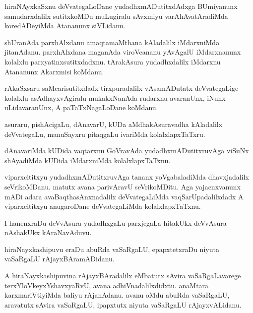 \documentclass{article}
\begin{document}
\begin{mn}
hiraNAyxkaSxnu deVvategaLoDane yudadhxmADutitxdAdxga BUmiyanunx
samudarxdalilx sutitxkoMDu muLugiralu sAvxmiyu varAhAvatAradiMda
koredADeyiMda Atananunx siVLidanu.
\end{mn}

\begin{mn}%
shUranAda parxhAlxdanu amaqtamaMthana kAladalilx iMdarxniMda
jitanAdanu. parxhAlxdana maganAda viroVcananu yAvAgalU iMdarxnanunx
kolalxlu parxyatinxsutitxdadxnu. tArakAsura yudadhxdalilx iMdarxnu
Atananunx Akarxmisi koMdanu.
\end{mn}

\begin{mn}
rAkaSxsaru saMcarisutitxdadx tirxpuradalilx vAsamADutatx deVvategaLige
kolalxlu asAdhayxvAgiralu mukakxNanAda rudarxnu avaranUnx, iNunx
uLidavaranUnx, A paTaTxNagaLoDane koMdanu.
\end{mn}

\begin{mn}
asuraru, pishAcigaLu, dAnavarU, kUDa aMdhakAsuravadha kAladalilx
deVvategaLu, manuSayxru pitaqgaLu ivariMda kolalxlapxTaTxru.
\end{mn}

\begin{mn}
dAnavariMda kUDida vaqtarxnu GoVravAda yudadhxmADutitxruvAga viSuNx
shAyadiMda kUDida iMdarxniMda kolalxlapxTaTxnu.
\end{mn}

\begin{mn}
viparxcititxyu yudadhxmADutitxruvAga tananx yoVgabaladiMda
dhavxjadalilx seVrikoMDanu. matutx avana parivAravU seVrikoMDitu. Aga
yajacnxvanunx mADi adara avaBaqthasAnxnadalilx deVvategaLiMda
vaqSarUpadalilxdadx A viparxcititxyu anugaroDane deVvategaLiMda kolalxlapxTaTxnu.
\end{mn}

\begin{mn}%
I hanenxraDu deVvAsura yudadhxgaLu parxjegaLa hitakUkx deVvAsura
nAshakUkx kAraNavAduvu.
\end{mn}

\begin{mn}
hiraNayxkashipuvu eraDu abuRda vaSaRgaLU, epapxtetxraDu niyuta
vaSaRgaLU rAjayxBAramADidanu.
\end{mn}

\begin{mn}
A hiraNayxkashipuvina rAjayxBAradalilx eMbatutx sAvira vaSaRgaLavarege
terxYloVkeyxYshavxyaRvU, avana adhiVnadalilxdidxtu. anaMtara
karxmariVtiyiMda baliyu rAjanAdanu. avanu oMdu abuRda vaSaRgaLU,
aravatutx sAvira vaSaRgaLU, ipapxtutx niyuta vaSaRgaLU rAjayxvALidanu.
\end{mn}
\end{document}
